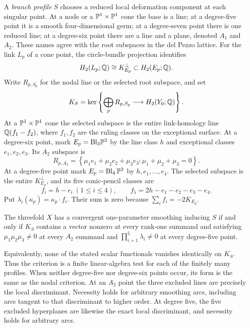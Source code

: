 A \emph{branch profile} $S$ chooses a reduced local deformation component
at each singular point.  At a node or a $\mathbb{P}^1\times\mathbb{P}^1$ cone the base
is a line; at a degree-five point it is a smooth four-dimensional germ;
at a degree-seven
point there is one reduced line; at a degree-six point there are a line
and a plane, denoted $A_1$ and $A_2$.  These names agree with the root
subspaces in the del Pezzo lattice.  For the link $L_p$ of a cone point,
the circle-bundle projection identifies
\[
 H_2(L_p;\mathbb{Q})\cong K_{E_p}^{\perp}\subset H_2(E_p;\mathbb{Q}).
\]
Write $R_{p,S_p}$ for the nodal line or the selected root subspace, and set
\begin{equation}\label{eq:relationkernel}
 K_S=\ker\left\{\bigoplus_pR_{p,S_p}
                         \longrightarrow H_2(Y_0;\mathbb{Q})\right\}.
\end{equation}
At a $\mathbb{P}^1\times\mathbb{P}^1$ cone the selected subspace is the entire
link-homology line $\mathbb{Q}(f_1-f_2)$, where $f_1,f_2$ are the ruling
classes on the exceptional surface.
At a degree-six point, mark $E_p=\mathrm{Bl}_3\mathbb{P}^2$ by the line class
$h$ and exceptional classes $e_1,e_2,e_3$.  Its $A_2$ subspace is
\[
R_{p,A_2}=\left\{\mu_1e_1+\mu_2e_2+\mu_3e_3:
                                  \mu_1+\mu_2+\mu_3=0\right\}.
\]
At a degree-five point mark $E_p=\operatorname{Bl}_4\mathbb{P}^2$
by $h,e_1,\ldots,e_4$.  The selected subspace is the entire
$K_{E_p}^\perp$, and its five conic-pencil classes are
\[
 f_i=h-e_i\ (1\le i\le4),\qquad
 f_5=2h-e_1-e_2-e_3-e_4.
\]
Put $\lambda_i(\kappa_p)=\kappa_p\cdot f_i$.  Their sum is
zero because $\sum_i f_i=-2K_{E_p}$.

\begin{thmletter}\label{thm:criterionintro}
The threefold $X$ has a convergent one-parameter smoothing inducing $S$
if and only if $K_S$ contains a vector nonzero at every rank-one summand
and satisfying $\mu_1\mu_2\mu_3\ne0$ at every $A_2$ summand
and $\prod_{i=1}^5\lambda_i\ne0$ at every degree-five point.
\end{thmletter}

Equivalently, none of the stated scalar functionals vanishes identically
on $K_S$.  Thus the criterion is a finite linear-algebra test for each
of the finitely many profiles.  When neither degree-five nor degree-six
points occur, its form is the same as the nodal criterion.  At an $A_2$
point the three excluded lines are precisely the local discriminant.
Necessity holds for arbitrary smoothing arcs, including arcs tangent to
that discriminant to higher order.
At degree five, the five excluded hyperplanes are likewise the
exact local discriminant, and necessity holds for arbitrary arcs.

